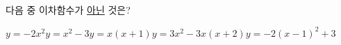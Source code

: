 다음 중 이차함수가 \underline{아닌} 것은?
\begin{choicesii}{$y=-2x^2$}{$y=x^2-3$}{$y=x(x+1)$}{$y=3x^2-3x(x+2)$}{$y=-2(x-1)^2+3$}\end{choicesii}
